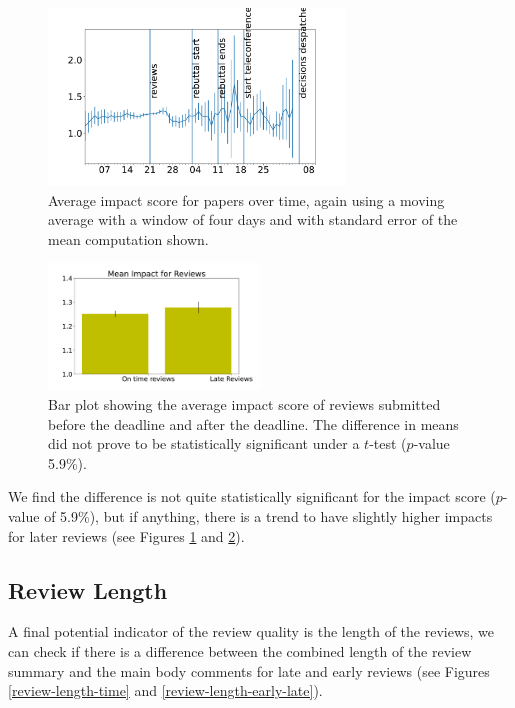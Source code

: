 \begin{figure}[htb]
\centering
\includegraphics[width=0.70\textwidth]{diagrams/neurips/review-impact-time.pdf}

\caption{Average impact score for papers over time, again using a moving average with a window of four days and with standard error of the mean computation shown.}
\label{review-impact-time}
\end{figure}

\begin{figure}[htb]
\centering
\includegraphics[width=0.50\textwidth]{diagrams/neurips/review-impact-early-late.pdf}

\caption{Bar plot showing the average impact score of
reviews submitted before the deadline and after the deadline. The
difference in means did not prove to be statistically significant under
a \(t\)-test (\(p\)-value 5.9\%).} \label{review-impact-early-late}
\end{figure}

We find the difference is not quite statistically significant for the
impact score (\(p\)-value of 5.9\%), but if anything, there is a trend
to have slightly higher impacts for later reviews (see Figures
\ref{review-impact-time} and \ref{review-impact-early-late}).

\subsection{Review Length}\label{review-length}

A final potential indicator of the review quality is the length of the
reviews, we can check if there is a difference between the combined
length of the review summary and the main body comments for late and
early reviews (see Figures \ref{review-length-time} and
\ref{review-length-early-late}).

